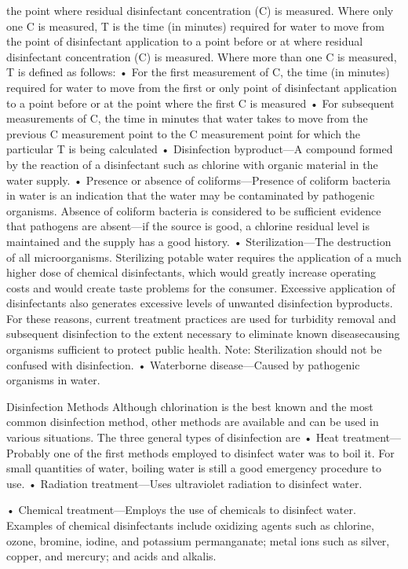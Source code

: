 \documentclass{article}
\begin{document}
the point where residual disinfectant concentration (C) is measured.
Where only one C is measured, T is the time (in minutes) required for
water to move from the point of disinfectant application to a point
before or at where residual disinfectant concentration (C) is measured.
Where more than one C is measured, T is defined as follows: • For the
first measurement of C, the time (in minutes) required for water to move
from the first or only point of disinfectant application to a point
before or at the point where the first C is measured • For subsequent
measurements of C, the time in minutes that water takes to move from the
previous C measurement point to the C measurement point for which the
particular T is being calculated • Disinfection byproduct---A compound
formed by the reaction of a disinfectant such as chlorine with organic
material in the water supply. • Presence or absence of
coliforms---Presence of coliform bacteria in water is an indication that
the water may be contaminated by pathogenic organisms. Absence of
coliform bacteria is considered to be sufficient evidence that pathogens
are absent---if the source is good, a chlorine residual level is
maintained and the supply has a good history. • Sterilization---The
destruction of all microorganisms. Sterilizing potable water requires
the application of a much higher dose of chemical disinfectants, which
would greatly increase operating costs and would create taste problems
for the consumer. Excessive application of disinfectants also generates
excessive levels of unwanted disinfection byproducts. For these reasons,
current treatment practices are used for turbidity removal and
subsequent disinfection to the extent necessary to eliminate known
diseasecausing organisms sufficient to protect public health. Note:
Sterilization should not be confused with disinfection. • Waterborne
disease---Caused by pathogenic organisms in water.

Disinfection Methods Although chlorination is the best known and the
most common disinfection method, other methods are available and can be
used in various situations. The three general types of disinfection are
• Heat treatment---Probably one of the first methods employed to
disinfect water was to boil it. For small quantities of water, boiling
water is still a good emergency procedure to use. • Radiation
treatment---Uses ultraviolet radiation to disinfect water.

• Chemical treatment---Employs the use of chemicals to disinfect water.
Examples of chemical disinfectants include oxidizing agents such as
chlorine, ozone, bromine, iodine, and potassium permanganate; metal ions
such as silver, copper, and mercury; and acids and alkalis.
\end{document}
